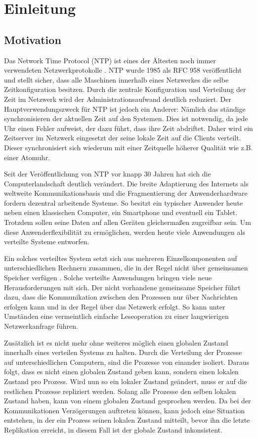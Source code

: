 \section{Einleitung}
\subsection{Motivation}
Das Network Time Protocol (NTP) ist eines der Ältesten noch immer verwendeten Netzwerkprotokolle \cite{cattini12}.
NTP wurde 1985 als RFC 958 veröffentlicht und stellt sicher, dass alle Maschinen innerhalb eines Netzwerkes die selbe Zeitkonfiguration besitzen.
Durch die zentrale Konfiguration und Verteilung der Zeit im Netzwerk wird der Administrationsaufwand deutlich reduziert.
Der Hauptverwendungszweck für NTP ist jedoch ein Anderer: Nämlich das ständige synchronisieren der aktuellen Zeit auf den Systemen.
Dies ist notwendig, da jede Uhr einen Fehler aufweist, der dazu führt, dass ihre Zeit abdriftet.
Daher wird ein Zeitserver im Netzwerk eingesetzt der seine lokale Zeit auf die Clients verteilt.
Dieser synchronisiert sich wiederum mit einer Zeitquelle höherer Qualität wie z.B. einer Atomuhr.

Seit der Veröffentlichung von NTP vor knapp 30 Jahren hat sich die Computerlandschaft deutlich verändert.
Die breite Adaptierung des Internets als weltweite Kommunikationsbasis und die Fragmentierung der Anwenderhardware fordern dezentral arbeitende Systeme.
So besitzt ein typischer Anwender heute neben einen klassischen Computer, ein Smartphone und eventuell ein Tablet.
Trotzdem sollen seine Daten auf allen Geräten gleichermaßen zugreifbar sein.
Um diese Anwenderflexibilität zu ermöglichen, werden heute viele Anwendungen als verteilte Systeme entworfen.

Ein solches verteiltes System setzt sich aus mehreren Einzelkomponenten auf unterschiedlichen Rechnern zusammen, die in der Regel nicht über gemeinsamen Speicher verfügen \cite{schill12}.
Solche verteilte Anwendungen bringen viele neue Herausforderungen mit sich.
Der nicht vorhandene gemeinsame Speicher führt dazu, dass die Kommunikation zwischen den Prozessen nur über Nachrichten erfolgen kann und in der Regel über das Netzwerk erfolgt. So kann unter Umständen eine vermeintlich einfache Leseoperation zu einer langwierigen Netzwerkanfrage führen.

Zusätzlich ist es nicht mehr ohne weiteres möglich einen globalen Zustand innerhalb eines verteilen Systems zu halten.
Durch die Verteilung der Prozesse auf unterschiedlichen Computern, sind die Prozesse von einander isoliert. Daraus folgt, dass es nicht einen globalen Zustand geben kann, sondern einen lokalen Zustand pro Prozess. Wird nun so ein lokaler Zustand geändert, muss er auf die restlichen Prozesse repliziert werden. Solang alle Prozesse den selben lokalen Zustand haben, kann von einem globalen Zustand gesprochen werden. Da bei der Kommunikationen Verzögerungen auftreten können, kann jedoch eine Situation entstehen, in der ein Prozess seinen lokalen Zustand mitteilt, bevor ihn die letzte Replikation erreicht, in diesem Fall ist der globale Zustand inkonsistent.

